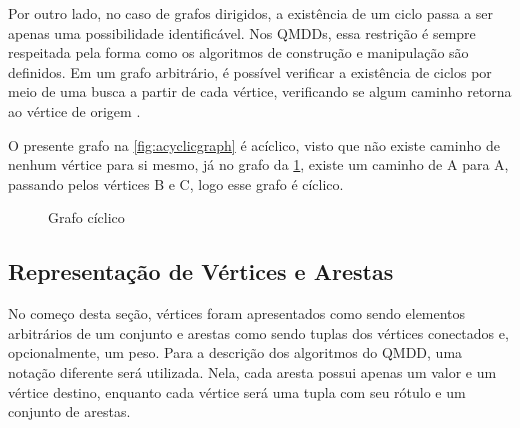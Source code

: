 Por outro lado, no caso de grafos dirigidos, a existência de um ciclo passa a ser apenas uma possibilidade identificável. Nos QMDDs, essa restrição é sempre respeitada pela forma como os algoritmos de construção e manipulação são definidos. Em um grafo arbitrário, é possível verificar a existência de ciclos por meio de uma busca a partir de cada vértice, verificando se algum caminho retorna ao vértice de origem \cite{jungnickel}.

O presente grafo na \cref{fig:acyclicgraph} é acíclico, visto que não existe caminho de nenhum vértice para si mesmo, já no grafo da \cref{fig:cyclicgraph}, existe um caminho de A para A, passando pelos vértices B e C, logo esse grafo é cíclico.

\begin{figure}[ht]
  \centering
  \begin{minipage}{0.45\textwidth}
    \centering
    \caption{Grafo acíclico}
    \label{fig:acyclicgraph}
  \end{minipage}
  \qquad
  \begin{minipage}{0.45\textwidth}
    \centering
    \caption{Grafo cíclico}
    \label{fig:cyclicgraph}
  \end{minipage}
\end{figure}

\subsection{Representação de Vértices e Arestas}

No começo desta seção, vértices foram apresentados como sendo elementos arbitrários de um conjunto e arestas como sendo tuplas dos vértices conectados e, opcionalmente, um peso. Para a descrição dos algoritmos do QMDD, uma notação diferente será utilizada. Nela, cada aresta possui apenas um valor e um vértice destino, enquanto cada vértice será uma tupla com seu rótulo e um conjunto de arestas.

